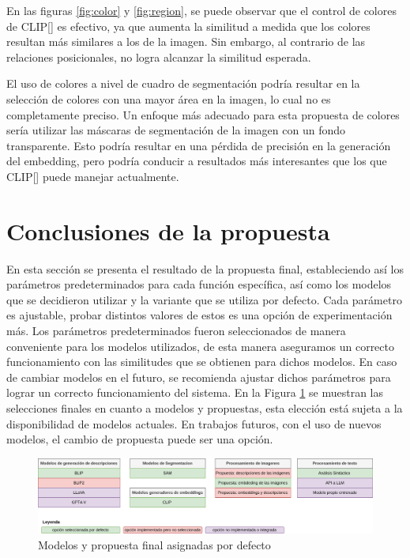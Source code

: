 En las figuras \ref{fig:color} y \ref{fig:region}, se puede observar que el control de colores de CLIP[\cite{clip}]  es efectivo, ya que aumenta la similitud a medida que los colores resultan más similares a los de la imagen. Sin embargo, al contrario de las relaciones posicionales, no logra alcanzar la similitud esperada.

El uso de colores a nivel de cuadro de segmentación podría resultar en la selección de colores con una mayor área en la imagen, lo cual no es completamente preciso. Un enfoque más adecuado para esta propuesta de colores sería utilizar las máscaras de segmentación de la imagen con un fondo transparente. Esto podría resultar en una pérdida de precisión en la generación del embedding, pero podría conducir a resultados más interesantes que los que CLIP[\cite{clip}] puede manejar actualmente.


\section{Conclusiones de la propuesta}
En esta sección se presenta el resultado de la propuesta final, estableciendo así los parámetros predeterminados para cada función específica, así como los modelos que se decidieron utilizar y la variante que se utiliza por defecto. Cada parámetro es ajustable, probar distintos valores de estos es una opción de experimentación más. Los parámetros predeterminados fueron seleccionados de manera conveniente para los modelos utilizados, de esta manera aseguramos un correcto funcionamiento con las similitudes que se obtienen para dichos modelos. En caso de cambiar modelos en el futuro, se recomienda ajustar dichos parámetros para lograr un correcto funcionamiento del sistema. En la Figura \ref{fig:propuestafinal} se muestran las selecciones finales en cuanto a modelos y propuestas, esta elección está sujeta a la disponibilidad de modelos actuales. En trabajos futuros, con el uso de nuevos modelos, el cambio de propuesta puede ser una opción.

\begin{figure}[H]
    \centering
     \includegraphics[width=\textwidth]{Graphics/PropuestaFinal.drawio.png}
     \caption{Modelos y propuesta final asignadas por defecto }
\label{fig:propuestafinal}
\end{figure}

